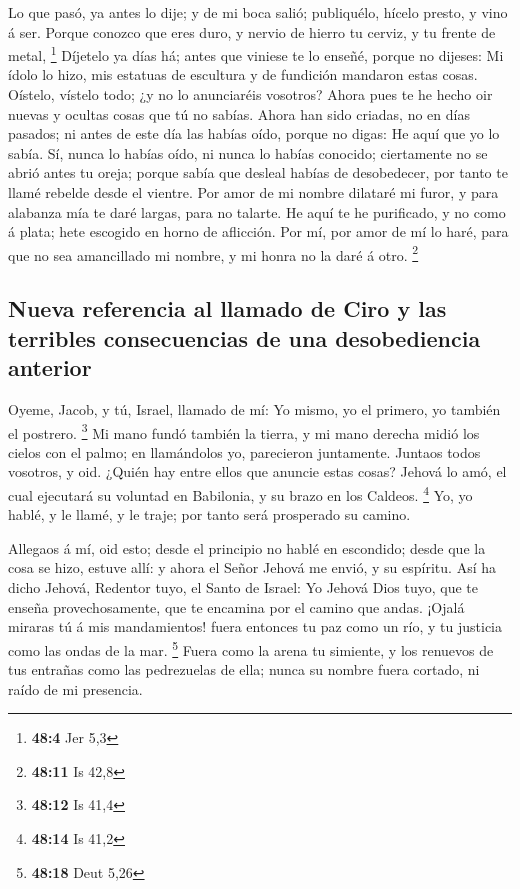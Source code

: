  Lo que pasó, ya antes lo dije; y de mi boca salió;
publiquélo, hícelo presto, y vino á ser.  Porque conozco que
eres duro, y nervio de hierro tu cerviz, y tu frente de metal,
\footnote{\textbf{48:4} Jer 5,3}  Díjetelo ya días há; antes
que viniese te lo enseñé, porque no dijeses: Mi ídolo lo hizo, mis
estatuas de escultura y de fundición mandaron estas cosas. 
Oístelo, vístelo todo; ¿y no lo anunciaréis vosotros? Ahora pues te he
hecho oir nuevas y ocultas cosas que tú no sabías.  Ahora
han sido criadas, no en días pasados; ni antes de este día las habías
oído, porque no digas: He aquí que yo lo sabía.  Sí, nunca
lo habías oído, ni nunca lo habías conocido; ciertamente no se abrió
antes tu oreja; porque sabía que desleal habías de desobedecer, por
tanto te llamé rebelde desde el vientre.  Por amor de mi
nombre dilataré mi furor, y para alabanza mía te daré largas, para no
talarte.  He aquí te he purificado, y no como á plata; hete
escogido en horno de aflicción.  Por mí, por amor de mí lo
haré, para que no sea amancillado mi nombre, y mi honra no la daré á
otro. \footnote{\textbf{48:11} Is 42,8}

\hypertarget{nueva-referencia-al-llamado-de-ciro-y-las-terribles-consecuencias-de-una-desobediencia-anterior}{%
\subsection{Nueva referencia al llamado de Ciro y las terribles
consecuencias de una desobediencia
anterior}\label{nueva-referencia-al-llamado-de-ciro-y-las-terribles-consecuencias-de-una-desobediencia-anterior}}

 Oyeme, Jacob, y tú, Israel, llamado de mí: Yo mismo, yo el
primero, yo también el postrero. \footnote{\textbf{48:12} Is 41,4}
 Mi mano fundó también la tierra, y mi mano derecha midió
los cielos con el palmo; en llamándolos yo, parecieron juntamente.
 Juntaos todos vosotros, y oid. ¿Quién hay entre ellos que
anuncie estas cosas? Jehová lo amó, el cual ejecutará su voluntad en
Babilonia, y su brazo en los Caldeos. \footnote{\textbf{48:14} Is 41,2}
 Yo, yo hablé, y le llamé, y le traje; por tanto será
prosperado su camino.

 Allegaos á mí, oid esto; desde el principio no hablé en
escondido; desde que la cosa se hizo, estuve allí: y ahora el Señor
Jehová me envió, y su espíritu.  Así ha dicho Jehová,
Redentor tuyo, el Santo de Israel: Yo Jehová Dios tuyo, que te enseña
provechosamente, que te encamina por el camino que andas. 
¡Ojalá miraras tú á mis mandamientos! fuera entonces tu paz como un río,
y tu justicia como las ondas de la mar. \footnote{\textbf{48:18} Deut
  5,26}  Fuera como la arena tu simiente, y los renuevos de
tus entrañas como las pedrezuelas de ella; nunca su nombre fuera
cortado, ni raído de mi presencia.

